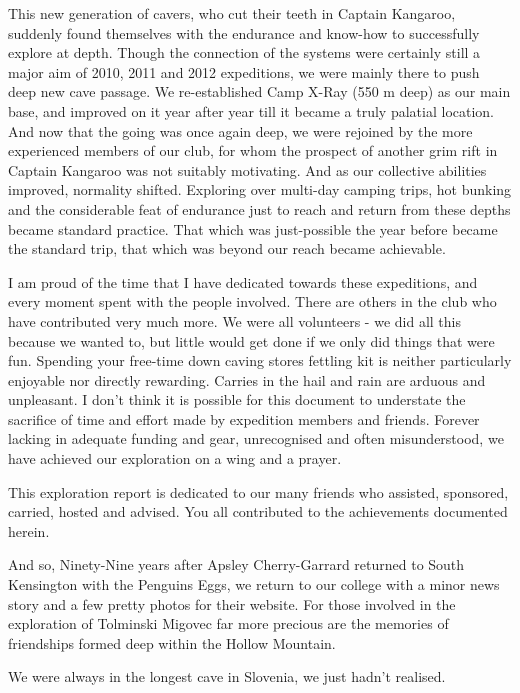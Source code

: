 This new generation of cavers, who cut their teeth in Captain Kangaroo,
suddenly found themselves with the endurance and know-how to
successfully explore at depth. Though the connection of the systems were
certainly still a major aim of 2010, 2011 and 2012 expeditions, we were
mainly there to push deep new cave passage. We re-established Camp X-Ray
(550 m deep) as our main base, and improved on it year after year till
it became a truly palatial location. And now that the going was once
again deep, we were rejoined by the more experienced members of our
club, for whom the prospect of another grim rift in Captain Kangaroo was
not suitably motivating. And as our collective abilities improved,
normality shifted. Exploring over multi-day camping trips, hot bunking
and the considerable feat of endurance just to reach and return from
these depths became standard practice. That which was just-possible the
year before became the standard trip, that which was beyond our reach
became achievable.

I am proud of the time that I have dedicated towards these expeditions,
and every moment spent with the people involved. There are others in the
club who have contributed very much more. We were all volunteers - we
did all this because we wanted to, but little would get done if we only
did things that were fun. Spending your free-time down caving stores
fettling kit is neither particularly enjoyable nor directly rewarding.
Carries in the hail and rain are arduous and unpleasant. I don't think
it is possible for this document to understate the sacrifice of time and
effort made by expedition members and friends. Forever lacking in
adequate funding and gear, unrecognised and often misunderstood, we have
achieved our exploration on a wing and a prayer.

This exploration report is dedicated to our many friends who assisted,
sponsored, carried, hosted and advised. You all contributed to the
achievements documented herein.

And so, Ninety-Nine years after Apsley Cherry-Garrard returned to South
Kensington with the Penguins Eggs, we return to our college with a minor
news story and a few pretty photos for their website. For those involved
in the exploration of Tolminski Migovec far more precious are the
memories of friendships formed deep within the Hollow Mountain.

We were always in the longest cave in Slovenia, we just hadn't realised.


